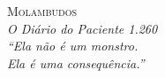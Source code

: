 \cleardoublepage
\thispagestyle{empty}
\vspace*{\fill}
\begin{center}
{\scshape\Large Molambudos}\\[0.4em]
{\small\itshape O Diário do Paciente 1.260}\\[6em]

{\large\itshape
``Ela não é um monstro.\\[0.5em]
Ela é uma consequência.''}
\end{center}
\vspace*{\fill}
\clearpage

